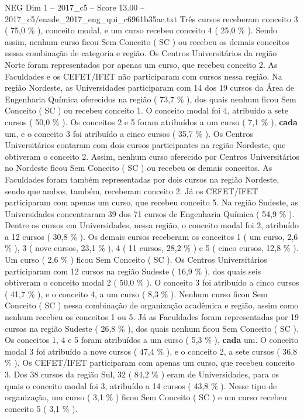 \begin{textsample}{NEG Dim 1 – 2017\_c5 – Score 13.00 – 2017\_c5/enade\_2017\_eng\_qui\_c6961b35ac.txt}
Três cursos receberam conceito 3 ( 75,0 \% ), conceito modal, e um curso recebeu conceito 4 ( 25,0 \% ).
Sendo assim, nenhum curso ficou Sem Conceito ( SC ) ou recebeu os demais conceitos nessa combinação de categoria e região.
Os Centros Universitários da região Norte foram representados por apenas um curso, que recebeu conceito 2.
As Faculdades e os CEFET/IFET não participaram com cursos nessa região.
Na região Nordeste, as Universidades participaram com 14 dos 19 cursos da Área de Engenharia Química oferecidos na região ( 73,7 \% ), dos quais nenhum ficou Sem Conceito ( SC ) ou recebeu conceito 1.
O conceito modal foi 4, atribuído a sete cursos ( 50,0 \% ).
Os conceitos 2 e 5 foram atribuídos a um curso ( 7,1 \% ), \textbf{cada} um, e o conceito 3 foi atribuído a cinco cursos ( 35,7 \% ).
Os Centros Universitários contaram com dois cursos participantes na região Nordeste, que obtiveram o conceito 2.
Assim, nenhum curso oferecido por Centros Universitários no Nordeste ficou Sem Conceito ( SC ) ou recebeu os demais conceitos.
As Faculdades foram também representadas por dois cursos na região Nordeste, sendo que ambos, também, receberam conceito 2.
Já os CEFET/IFET participaram com apenas um curso, que recebeu conceito 5.
Na região Sudeste, as Universidades concentraram 39 dos 71 cursos de Engenharia Química ( 54,9 \% ).
Dentre os cursos em Universidades, nessa região, o conceito modal foi 2, atribuído a 12 cursos ( 30,8 \% ).
Os demais cursos receberam os conceitos 1 ( um curso, 2,6 \% ), 3 ( nove cursos, 23,1 \% ), 4 ( 11 cursos, 28,2 \% ) e 5 ( cinco cursos, 12,8 \% ).
Um curso ( 2,6 \% ) ficou Sem Conceito ( SC ).
Os Centros Universitários participaram com 12 cursos na região Sudeste ( 16,9 \% ), dos quais seis obtiveram o conceito modal 2 ( 50,0 \% ).
O conceito 3 foi atribuído a cinco cursos ( 41,7 \% ), e o conceito 4, a um curso ( 8,3 \% ).
Nenhum curso ficou Sem Conceito ( SC ) nessa combinação de organização acadêmica e região, assim como nenhum recebeu os conceitos 1 ou 5.
Já as Faculdades foram representadas por 19 cursos na região Sudeste ( 26,8 \% ), dos quais nenhum ficou Sem Conceito ( SC ).
Os conceitos 1, 4 e 5 foram atribuídos a um curso ( 5,3 \% ), \textbf{cada} um.
O conceito modal 3 foi atribuído a nove cursos ( 47,4 \% ), e o conceito 2, a sete cursos ( 36,8 \% ).
Os CEFET/IFET participaram com apenas um curso, que recebeu conceito 3.
Dos 38 cursos da região Sul, 32 ( 84,2 \% ) eram de Universidades, para os quais o conceito modal foi 3, atribuído a 14 cursos ( 43,8 \% ).
Nesse tipo de organização, um curso ( 3,1 \% ) ficou Sem Conceito ( SC ) e um curso recebeu conceito 5 ( 3,1 \% ).

\end{textsample}
